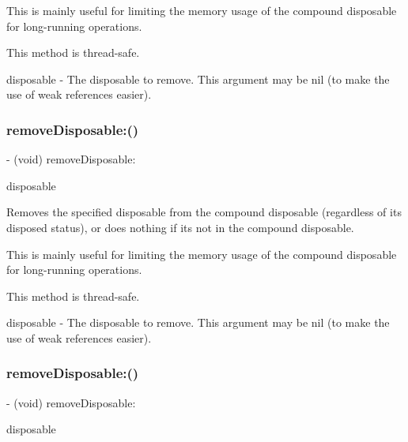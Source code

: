 This is mainly useful for limiting the memory usage of the compound disposable for long-\/running operations.

This method is thread-\/safe.

disposable -\/ The disposable to remove. This argument may be nil (to make the use of weak references easier). \mbox{\label{interface_r_a_c_compound_disposable_a8aabb5a290a10d14c6ca9c966701d1b3}} 
\subsubsection{\texorpdfstring{remove\+Disposable\+:()}{removeDisposable:()}\hspace{0.1cm}{\footnotesize\ttfamily [2/3]}}
{\footnotesize\ttfamily -\/ (void) remove\+Disposable\+: \begin{DoxyParamCaption}\item[{(\mbox{\hyperlink{interface_r_a_c_disposable}{R\+A\+C\+Disposable}} $\ast$)}]{disposable }\end{DoxyParamCaption}}

Removes the specified disposable from the compound disposable (regardless of its disposed status), or does nothing if it\textquotesingle{}s not in the compound disposable.

This is mainly useful for limiting the memory usage of the compound disposable for long-\/running operations.

This method is thread-\/safe.

disposable -\/ The disposable to remove. This argument may be nil (to make the use of weak references easier). \mbox{\label{interface_r_a_c_compound_disposable_a8aabb5a290a10d14c6ca9c966701d1b3}} 
\subsubsection{\texorpdfstring{remove\+Disposable\+:()}{removeDisposable:()}\hspace{0.1cm}{\footnotesize\ttfamily [3/3]}}
{\footnotesize\ttfamily -\/ (void) remove\+Disposable\+: \begin{DoxyParamCaption}\item[{(\mbox{\hyperlink{interface_r_a_c_disposable}{R\+A\+C\+Disposable}} $\ast$)}]{disposable }\end{DoxyParamCaption}}


